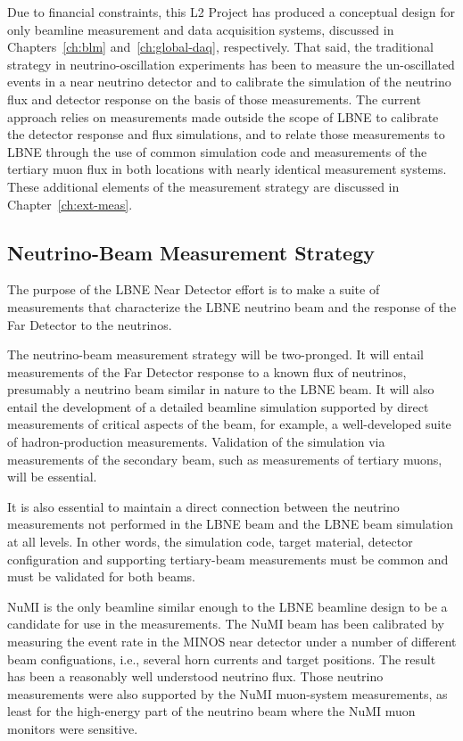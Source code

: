 Due to financial constraints, this L2 Project has produced a conceptual design for only beamline measurement and data acquisition systems, discussed in Chapters~\ref{ch:blm} and~\ref{ch:global-daq}, respectively.  
That said, the traditional strategy in neutrino-oscillation experiments has been to measure the un-oscillated events in a near neutrino detector and to calibrate the simulation of the neutrino flux
and detector response on the basis of those measurements. 
The current approach relies on measurements made outside the scope of LBNE to calibrate the detector response and flux simulations, and to relate those measurements to LBNE through the use of common simulation code and measurements of the tertiary muon flux in both locations with nearly identical
 measurement systems. 
These additional elements of the measurement strategy are discussed in Chapter~\ref{ch:ext-meas}. 

\subsection{Neutrino-Beam Measurement Strategy}
\label{subsec:nu-meas-strat}

The purpose of the LBNE Near Detector effort is to make a suite of measurements that
characterize the LBNE neutrino beam and the response of the Far Detector to the neutrinos.

The neutrino-beam measurement strategy will be two-pronged. It will entail measurements of the Far Detector response to a known flux of neutrinos, presumably a neutrino beam similar in nature to the LBNE beam. It will also entail the development of a detailed beamline simulation supported by direct measurements of critical aspects of the beam, 
for example, a well-developed suite of hadron-production measurements. Validation of the simulation via measurements of the secondary 
beam, such as measurements of tertiary muons, will be essential.

It is also essential to maintain a direct connection between the neutrino measurements not performed in the LBNE beam and the LBNE beam simulation at all levels. 
In other words, the simulation code, target material, detector configuration and supporting tertiary-beam measurements must be common and must be validated for both beams. 

NuMI is the only beamline similar enough to the LBNE beamline design to be a candidate for use in the measurements. The NuMI beam has been calibrated by measuring the event rate in the MINOS near detector under a number of different beam configuations, i.e., several horn currents and target positions. The result has been a reasonably well understood neutrino flux. Those neutrino measurements were also supported by the NuMI muon-system measurements, as least for the high-energy part of the neutrino beam where the NuMI muon monitors were sensitive. 

